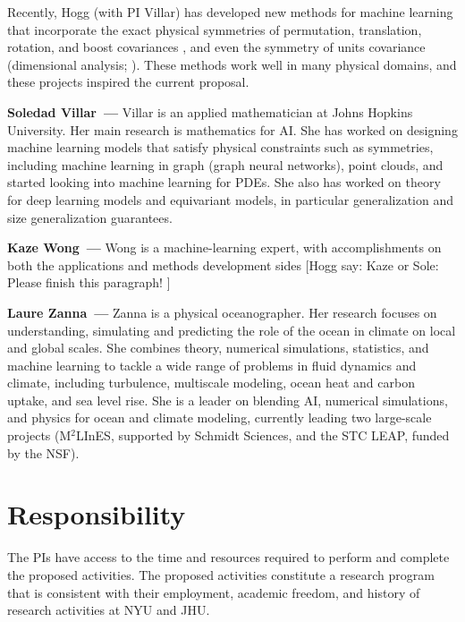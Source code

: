 \documentclass[11pt]{article}
\renewcommand{\paragraph}[1]{\medskip\par\noindent\textbf{#1~---}}
\newcommand{\hogg}[1]{{\color{red}[Hogg say: #1 ]}}
\begin{document}
Recently, Hogg (with PI Villar) has developed new methods for machine learning that incorporate the exact physical symmetries of permutation, translation, rotation, and boost covariances \cite{villar2021scalars}, and even the symmetry of units covariance (dimensional analysis; \cite{villar2023dimensionless}).
These methods work well in many physical domains, and these projects inspired the current proposal.

\paragraph{Soledad Villar} Villar is an applied mathematician at Johns Hopkins University. Her main research is mathematics for AI. She has worked on designing machine learning models that satisfy physical constraints such as symmetries, including machine learning in graph (graph neural networks), point clouds, and started looking into machine learning for PDEs. She also has worked on theory for deep learning models and equivariant models, in particular generalization and size generalization guarantees.

\paragraph{Kaze Wong} Wong is a machine-learning expert, with accomplishments on both the applications and methods development sides \hogg{Kaze or Sole: Please finish this paragraph!}

\paragraph{Laure Zanna} Zanna is a physical oceanographer. Her research focuses on understanding, simulating and predicting the role of the ocean in climate on local and global scales. She combines theory, numerical simulations, statistics, and machine learning to tackle a wide range of problems in fluid dynamics and climate, including turbulence, multiscale modeling, ocean heat and carbon uptake, and sea level rise. She is a leader on blending AI, numerical simulations, and physics for ocean and climate modeling, currently leading two large-scale projects (M$^{2}$LInES, supported by Schmidt Sciences, and the STC LEAP, funded by the NSF). 

\section{Responsibility}
The PIs have access to the time and resources required to perform and complete the proposed activities.
The proposed activities constitute a research program that is consistent with their employment, academic freedom, and history of research activities at NYU and JHU.
\end{document}
